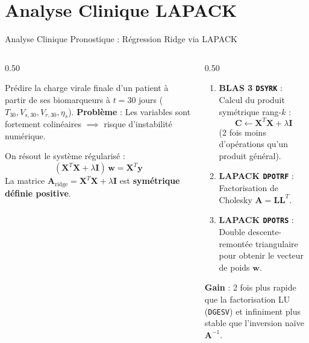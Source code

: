 \documentclass[aspectratio=169, 10pt, french]{beamer}
\begin{document}
\section{Analyse Clinique LAPACK}
\begin{frame}{Analyse Clinique Pronostique : Régression Ridge via LAPACK}
    \begin{columns}[c]
        \begin{column}{0.50\textwidth}
            \begin{cadreclinique}
                \small
                Prédire la charge virale finale d'un patient à partir de ses biomarqueurs à $t = 30$ jours ($T_{30}, V_{s,30}, V_{r,30}, \eta_s$).
                \textbf{Problème} : Les variables sont fortement colinéaires $\implies$ risque d'instabilité numérique.
            \end{cadreclinique}
            \vspace{0.1cm}
            \begin{cadreconcept}
                \small
                On résout le système régularisé :
                $$(\mathbf{X}^T\mathbf{X} + \lambda\mathbf{I})\,\mathbf{w} = \mathbf{X}^T\mathbf{y}$$
                La matrice $\mathbf{A}_{\text{ridge}} = \mathbf{X}^T\mathbf{X} + \lambda\mathbf{I}$ est \textbf{symétrique définie positive}.
            \end{cadreconcept}
        \end{column}

        \begin{column}{0.50\textwidth}
            \begin{cadrehpc}
                \small
                \begin{enumerate}
                    \item \textbf{BLAS 3 \texttt{DSYRK}} :
                    Calcul du produit symétrique rang-$k$ :
                    $$\mathbf{C} \leftarrow \mathbf{X}^T\mathbf{X} + \lambda\mathbf{I}$$
                    (2 fois moins d'opérations qu'un produit général).
                    \item \textbf{LAPACK \texttt{DPOTRF}} :
                    Factorisation de Cholesky $\mathbf{A} = \mathbf{L}\mathbf{L}^T$.
                    \item \textbf{LAPACK \texttt{DPOTRS}} :
                    Double descente-remontée triangulaire pour obtenir le vecteur de poids $\mathbf{w}$.
                \end{enumerate}
                \textbf{Gain} : 2 fois plus rapide que la factorisation LU (\texttt{DGESV}) et infiniment plus stable que l'inversion naïve $\mathbf{A}^{-1}$.
            \end{cadrehpc}
        \end{column}
    \end{columns}
\end{frame}
\end{document}
